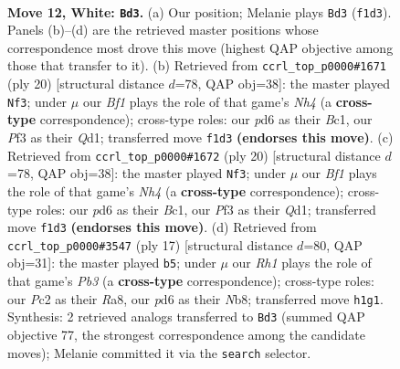\documentclass[11pt]{article}
\begin{document}
\begin{figure}[p]
\label{fig:thought-m20}
\end{figure}

\clearpage

\begin{figure}[p]\centering
\begin{subfigure}{0.46\textwidth}\centering
\resizebox{\linewidth}{!}{%
\newchessgame
\chessboard[
  setfen={r2qkb1r/pp1bpp1p/n2p1np1/8/3NP3/2N1BP2/PPP2QPP/2K1RB1R w kq - 9 12},
  showmover=false,
  pgfstyle=straightmove, color=movearrow, markmove={f1-d3}
]}
\caption{}
\end{subfigure}\hfill
\begin{subfigure}{0.46\textwidth}\centering
\resizebox{\linewidth}{!}{%
\newchessgame
\chessboard[
  setfen={rn1q1rk1/pp1bppbp/3p1np1/3P4/7N/2N3P1/PP2PPBP/R1BQ1RK1 w - - 1 11},
  showmover=false,
  pgfstyle=straightmove, color=movearrow, markmove={h4-f3}
]}
\caption{}
\end{subfigure}
\\[4pt]
\begin{subfigure}{0.46\textwidth}\centering
\resizebox{\linewidth}{!}{%
\newchessgame
\chessboard[
  setfen={rn1q1rk1/pp1bppbp/3p1np1/3P4/7N/2N3P1/PP2PPBP/R1BQ1RK1 w - - 1 11},
  showmover=false,
  pgfstyle=straightmove, color=movearrow, markmove={h4-f3}
]}
\caption{}
\end{subfigure}\hfill
\begin{subfigure}{0.46\textwidth}\centering
\resizebox{\linewidth}{!}{%
\newchessgame
\chessboard[
  setfen={rnbqk2r/4bppp/pp1p1n2/2pP4/8/P1N1PN2/1P2BPPP/R1BQK2R b KQkq - 0 9},
  showmover=false,
  pgfstyle=straightmove, color=movearrow, markmove={b6-b5}
]}
\caption{}
\end{subfigure}
\caption{\textbf{Move 12, White: \texttt{Bd3}.} (a) Our position; Melanie plays \texttt{Bd3} (\texttt{f1d3}). Panels (b)--(d) are the retrieved master positions whose correspondence most drove this move (highest QAP objective among those that transfer to it). (b) Retrieved from \texttt{ccrl\_top\_p0000\#1671} (ply 20) [structural distance $d$=78, QAP obj=38]: the master played \texttt{Nf3}; under $\mu$ our \emph{Bf1} plays the role of that game's \emph{Nh4} (a \textbf{cross-type} correspondence); cross-type roles: our \emph{p}d6 as their \emph{B}c1, our \emph{P}f3 as their \emph{Q}d1; transferred move \texttt{f1d3} \textbf{(endorses this move)}. (c) Retrieved from \texttt{ccrl\_top\_p0000\#1672} (ply 20) [structural distance $d$=78, QAP obj=38]: the master played \texttt{Nf3}; under $\mu$ our \emph{Bf1} plays the role of that game's \emph{Nh4} (a \textbf{cross-type} correspondence); cross-type roles: our \emph{p}d6 as their \emph{B}c1, our \emph{P}f3 as their \emph{Q}d1; transferred move \texttt{f1d3} \textbf{(endorses this move)}. (d) Retrieved from \texttt{ccrl\_top\_p0000\#3547} (ply 17) [structural distance $d$=80, QAP obj=31]: the master played \texttt{b5}; under $\mu$ our \emph{Rh1} plays the role of that game's \emph{Pb3} (a \textbf{cross-type} correspondence); cross-type roles: our \emph{P}c2 as their \emph{R}a8, our \emph{p}d6 as their \emph{N}b8; transferred move \texttt{h1g1}. Synthesis: 2 retrieved analogs transferred to \texttt{Bd3} (summed QAP objective 77, the strongest correspondence among the candidate moves); Melanie committed it via the \texttt{search} selector.}

\end{figure}
\end{document}
